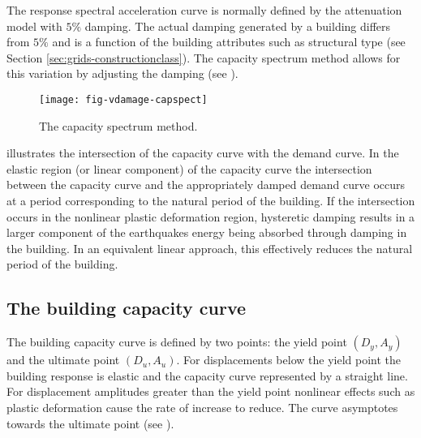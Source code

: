 The response spectral acceleration curve is normally defined by the attenuation model
with $5\%$ damping.  The actual damping generated by a building
differs from $5\%$ and is a function of the building attributes
such as structural type (see Section \ref{sec:grids-constructionclass}). The capacity
spectrum method allows for this
variation by adjusting the damping (see
).

\begin{figure}[htp]
\centering {}
 
\texttt{[image: fig-vdamage-capspect]}
\caption{The capacity spectrum method.} \label{fig:vdamage-capspect}
\end{figure}


 illustrates the intersection of the
capacity curve with the demand
curve.  In the elastic region (or linear
component) of the capacity curve the
intersection between the capacity curve and
the appropriately damped demand curve occurs
at a period corresponding to the natural period of the building.
If the intersection occurs in the nonlinear plastic deformation
region, hysteretic damping results in a larger component of the
earthquakes energy being absorbed through damping in the building.
In an equivalent linear approach, this effectively reduces the
natural period of the building.


\subsection{The building capacity curve}
\label{sec:v-dam-capspect-capcurve}

The building capacity curve is defined by two points:
the yield point $(D_y, A_y)$ and the ultimate point $(D_u, A_u)$.
For displacements below the yield point the building response is
elastic and the capacity curve represented
by a straight line. For displacement amplitudes greater than the
yield point nonlinear effects such as plastic deformation cause
the rate of increase to reduce. The curve asymptotes towards the
ultimate point (see ).

